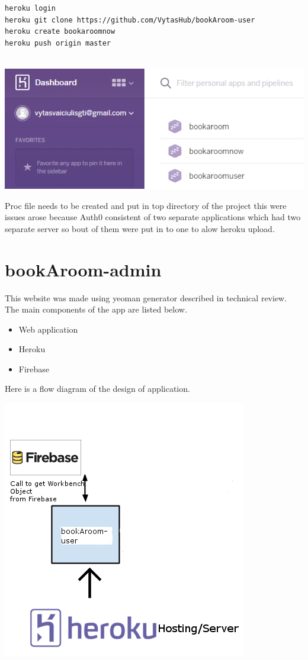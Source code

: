 \begin{itemize}
\begin{verbatim}
heroku login
heroku git clone https://github.com/VytasHub/bookAroom-user
heroku create bookaroomnow
heroku push origin master


\end{verbatim}

\begin{center}    
	\includegraphics{img/Heroku.png}
\end{center}

Proc file needs to be created and put in top directory of the project this were issues arose because Auth0 consistent of two separate applications which had two separate server so bout of them were put in to one to alow heroku upload.




\section{bookAroom-admin}
This website was made using yeoman generator described in technical review. The main components of the app are listed below.

\begin{itemize}
	\item Web application
	\item Heroku
	\item Firebase 
\end{itemize}
\pagebreak

Here is a flow diagram of the design of application.

\begin{center}    
	\includegraphics{img/bookAdmin.png}
\end{center}

\end{itemize}
